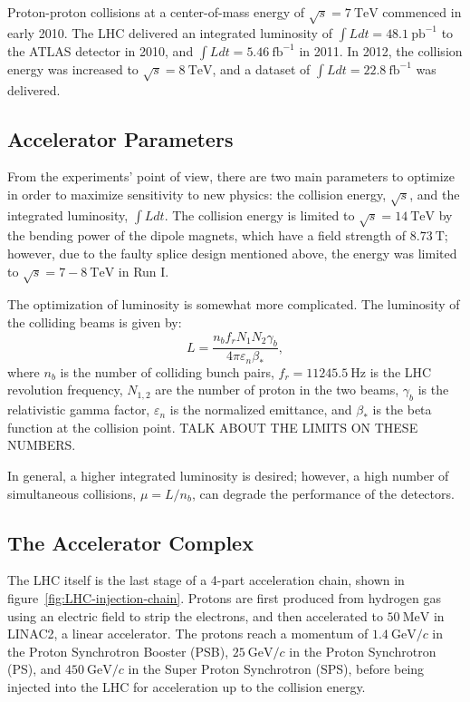 Proton-proton collisions at a center-of-mass energy of $\sqrt{s}=7~\mbox{TeV}$ commenced in early 2010. The LHC delivered an integrated luminosity of $\int L dt=48.1~\mbox{pb}^{-1}$ to the ATLAS detector in 2010, and $\int L dt=5.46~\mbox{fb}^{-1}$ in 2011. In 2012, the collision energy was increased to $\sqrt{s}=8~\mbox{TeV}$, and a dataset of $\int L dt=22.8~\mbox{fb}^{-1}$ was delivered. 

\subsection{Accelerator Parameters}
From the experiments' point of view, there are two main parameters to optimize in order to maximize sensitivity to new physics: the collision energy, $\sqrt{s}$, and the integrated luminosity, $\int L dt$. The collision energy is limited to $\sqrt{s}=14~\mbox{TeV}$ by the bending power of the dipole magnets, which have a field strength of $8.73~\mbox{T}$; however, due to the faulty splice design mentioned above, the energy was limited to $\sqrt{s}=7-8~\mbox{TeV}$ in Run I. 

The optimization of luminosity is somewhat more complicated.  The luminosity of the colliding beams is given by:
\begin{equation}\label{eqn:lumi}
	L = \frac{n_b f_r N_1 N_2 \gamma_b}{4\pi \varepsilon_n \beta_{*}},
\end{equation}
where $n_b$ is the number of colliding bunch pairs, $f_r=11245.5~\mbox{Hz}$ is the LHC revolution frequency, $N_{1,2}$ are the number of proton in the two beams, $\gamma_b$ is the relativistic gamma factor, $\varepsilon_n$ is the normalized emittance, and $\beta_{*}$ is the beta function at the collision point. TALK ABOUT THE LIMITS ON THESE NUMBERS.

In general, a higher integrated luminosity is desired; however, a high number of simultaneous collisions, $\mu=L/n_b$, can degrade the performance of the detectors. 


\subsection{The Accelerator Complex}
The LHC itself is the last stage of a 4-part acceleration chain, shown in figure~\ref{fig:LHC-injection-chain}. Protons are first produced from hydrogen gas using an electric field to strip the electrons, and then accelerated to $50~\mbox{MeV}$ in LINAC2, a linear accelerator. The protons reach a momentum of $1.4~\mbox{GeV}/c$ in the Proton Synchrotron Booster (PSB), $25~\mbox{GeV}/c$ in the Proton Synchrotron (PS), and $450~\mbox{GeV}/c$ in the Super Proton Synchrotron (SPS), before being injected into the LHC for acceleration up to the collision energy. 

